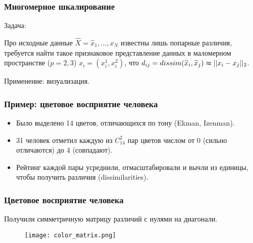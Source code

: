 \documentclass[10pt]{beamer}
\begin{document}
\begin{frame}
\frametitle{Многомерное шкалирование}

Задача: 

\vspace{\baselineskip}
Про исходные данные $\widehat{X} = {\widehat{x}_1, ..., \widehat{x}_N}$ известны лишь попарные различия, требуется найти такое признаковое представление данных в маломерном пространстве ($p = 2, 3$) $x_i = (x_i^1, x_i^2)$, что $d_{ij} = dissim(\widehat{x}_i, \widehat{x}_j) \thickapprox ||x_i - x_j||_2$.

\vspace{\baselineskip}
Применение: визуализация.


\end{frame}

\begin{frame}
\frametitle{Пример: цветовое восприятие человека}
\begin{itemize}
	\item {Было выделено 14 цветов, отличающихся по тону (Ekman, Izenman).}
	\item {31 человек отметил каждую из $C_{14}^2$ пар цветов числом от 0 (сильно отличаются) до 4 (совпадают).}
	\item {Рейтинг каждой пары усреднили, отмасштабировали и вычли из единицы, чтобы получить различия (dissimilarities).}
\end{itemize}


\end{frame}

\begin{frame}
\frametitle{Цветовое восприятие человека}

Получили симметричную матрицу различий с нулями на диагонали.
\begin{figure}
\centering
        \texttt{[image: color\_matrix.png]}
\end{figure}

\end{frame}
\end{document}

